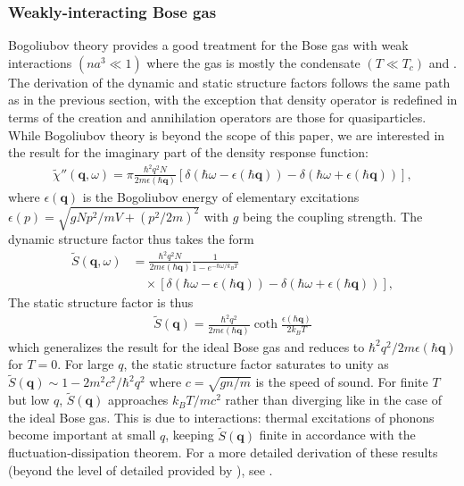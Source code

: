 \documentclass[reprint,
nofootinbib,
amsmath,amssymb,
aps]{revtex4-1}
\newcommand{\f}[2]{\frac{#1}{#2}}
\begin{document}
\subsubsection{Weakly-interacting Bose gas}
Bogoliubov theory provides a good treatment for the Bose gas with weak interactions $(na^3\ll1)$ where the gas is mostly the condensate $(T\ll T_c)$ and . The derivation of the dynamic and static structure factors follows the same path as in the previous section, with the exception that density operator is redefined in terms of the creation and annihilation operators are those for quasiparticles. While Bogoliubov theory is beyond the scope of this paper, we are interested in the result for the imaginary part of the density response function:
\begin{align*}
\widetilde{\chi}''(\mathbf{q},\omega) = \pi \f{\hbar^2 q^2 N}{2m \epsilon(\mathbf{\hbar q})} 
[\delta(\hbar \omega - \epsilon(\mathbf{\hbar q})) - \delta(\hbar \omega + \epsilon(\mathbf{\hbar q}))],
\end{align*}
where $\epsilon(\mathbf{q})$ is the Bogoliubov energy of elementary excitations $\epsilon(p) = \sqrt{gNp^2/mV + (p^2/2m)^2}$ with $g$ being the coupling strength. The dynamic structure factor thus takes the form
\begin{align*}
\widetilde{S}(\mathbf{q},\omega) 
&= \f{\hbar^2 q^2 N}{2m\epsilon(\mathbf{\hbar q})} \f{1}{1-e^{-\hbar \omega/k_BT}} \\
&\quad\times[\delta(\hbar \omega - \epsilon(\mathbf{\hbar q})) - \delta(\hbar \omega + \epsilon(\mathbf{\hbar q}))],
\end{align*}
The static structure factor is thus 
\begin{align*}
\widetilde{S}(\mathbf{q}) = \f{\hbar^2 q^2}{2m\epsilon(\mathbf{\hbar q})} \coth \f{\epsilon(\hbar\mathbf{q})}{2k_BT}
\end{align*}
which generalizes the result for the ideal Bose gas and reduces to $\hbar^2 q^2/2m\epsilon(\hbar \mathbf{q})$ for $T = 0$. For large $q$, the static structure factor saturates to unity as $\widetilde{S}(\mathbf{q}) \sim 1 - 2m^2c^2 / \hbar^2 q^2$ where $c = \sqrt{gn/m}$ is the speed of sound. For finite $T$ but low $q$, $\widetilde{S}(\mathbf{q})$ approaches $k_BT / mc^2$ rather than diverging like in the case of the ideal Bose gas. This is due to interactions: thermal excitations of phonons become important at small $q$, keeping $\widetilde{S}(\mathbf{q})$ finite in accordance with the fluctuation-dissipation theorem. For a more detailed derivation of these results (beyond the level of detailed provided by \cite{pitaevskii2016bose}), see \cite{yukalov2007structure}. 
\end{document}
